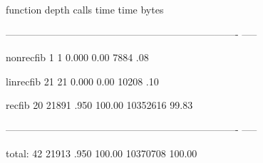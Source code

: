 \documentclass{article}
\def\emptyline{\vspace{12pt}}
\begin{document}
\begin{maplegroup}
\begin{mapleinput}
\end{mapleinput}

\mapleresult
\begin{maplettyout}
function           depth    calls     time    time%
bytes%
\end{maplettyout}

\begin{maplettyout}
----------------------------------------------------------------------
-----
\end{maplettyout}

\begin{maplettyout}
nonrecfib              1        1    0.000     0.00          7884     
.08
\end{maplettyout}

\begin{maplettyout}
linrecfib             21       21    0.000     0.00         10208     
.10
\end{maplettyout}

\begin{maplettyout}
recfib                20    21891     .950   100.00      10352616   
99.83
\end{maplettyout}

\begin{maplettyout}
----------------------------------------------------------------------
-----
\end{maplettyout}

\begin{maplettyout}
total:                42    21913     .950   100.00      10370708  
100.00
\end{maplettyout}

\emptyline
\end{maplegroup}
\begin{maplegroup}
\begin{mapleinput}
\end{mapleinput}

\end{maplegroup}
\begin{maplegroup}
\begin{mapleinput}
\end{mapleinput}

\end{maplegroup}
\end{document}
